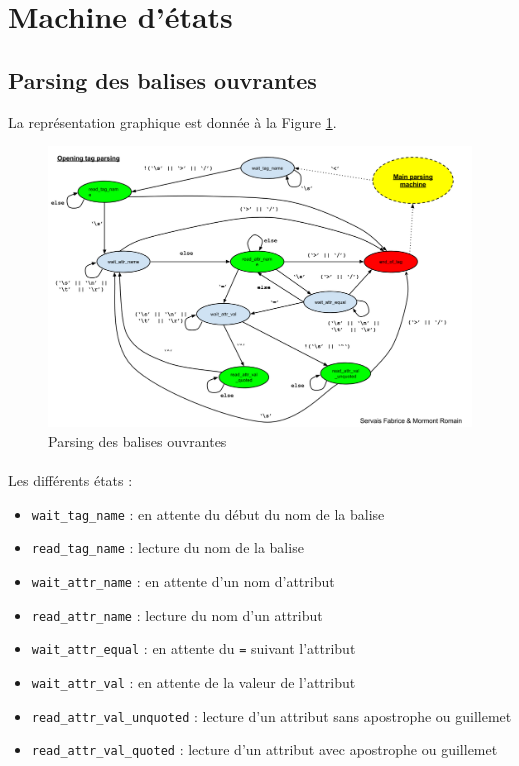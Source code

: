 \documentclass[a4paper,11pt]{article}
\begin{document}
\newpage
\appendix
\section{Machine d'états}
\subsection{Parsing des balises ouvrantes}
La représentation graphique est donnée à la Figure \ref{ref:pars_opening}.

\begin{figure}[h]
	\center
	\includegraphics[scale=0.35]{parseOpeningTagFSM.png}
	\caption{Parsing des balises ouvrantes}
	\label{ref:pars_opening}
\end{figure}

\paragraph{}
Les différents états :
\begin{itemize}
	\item \texttt{wait\_tag\_name} : en attente du début du nom de la balise 
	\item \texttt{read\_tag\_name} : lecture du nom de la balise
	\item \texttt{wait\_attr\_name} : en attente d'un nom d'attribut
	\item \texttt{read\_attr\_name} : lecture du nom d'un attribut
	\item \texttt{wait\_attr\_equal} : en attente du \texttt{=} suivant l'attribut
	\item \texttt{wait\_attr\_val} : en attente de la valeur de l'attribut
	\item \texttt{read\_attr\_val\_unquoted} : lecture d'un attribut sans apostrophe ou guillemet
	\item \texttt{read\_attr\_val\_quoted} :  lecture d'un attribut avec apostrophe ou guillemet
\end{itemize}
\end{document}
